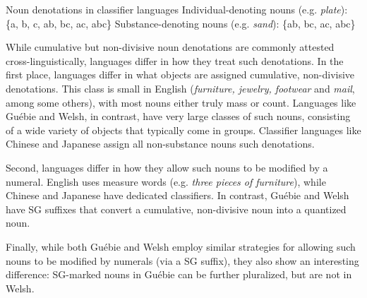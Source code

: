 \documentclass[output=paper,colorlinks,citecolor=brown]{langscibook}
\begin{document}
\ea%
    \label{ex:sande:21}
    Noun denotations in classifier languages
    \ea%
    \label{ex:sande:21a}
    Individual-denoting nouns (e.g. \textit{plate}): \{a, b, c, ab, bc, ac, abc\}
    \ex%
    \label{ex:sande:21b}
    Substance-denoting nouns (e.g. \textit{sand}): \{ab, bc, ac, abc\}
    \z
\z

While cumulative but non-divisive noun denotations are commonly attested cross-linguistically, languages differ in how they treat such denotations.
In the first place, languages differ in what objects are assigned cumulative, non-divisive denotations. This class is small in English (\textit{furniture, jewelry, footwear} and \textit{mail}, among some others), with most nouns either truly mass or count. Languages like Guébie and Welsh, in contrast, have very large classes of such nouns, consisting of a wide variety of objects that typically come in groups. Classifier languages like Chinese and Japanese assign all non-substance nouns such denotations.

Second, languages differ in how they allow such nouns to be modified by a numeral. English uses measure words (e.g. \textit{three pieces of furniture}), while Chinese and Japanese have dedicated classifiers. In contrast, Guébie and Welsh have SG suffixes that convert a cumulative, non-divisive noun into a quantized noun.

Finally, while both Guébie and Welsh employ similar strategies for allowing such nouns to be modified by numerals (via a SG suffix), they also show an interesting difference: SG-marked nouns in Guébie can be further pluralized, but are not in Welsh.


\end{document}
